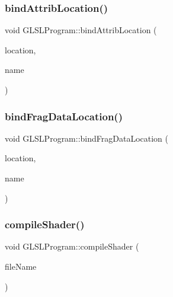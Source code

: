 \subsubsection{\texorpdfstring{bindAttribLocation()}{bindAttribLocation()}}
{\footnotesize\ttfamily void G\+L\+S\+L\+Program\+::bind\+Attrib\+Location (\begin{DoxyParamCaption}\item[{G\+Luint}]{location,  }\item[{const char $\ast$}]{name }\end{DoxyParamCaption})}

\mbox{\label{class_g_l_s_l_program_a44270f942de121ef2493e26f1226a902}} 
\subsubsection{\texorpdfstring{bindFragDataLocation()}{bindFragDataLocation()}}
{\footnotesize\ttfamily void G\+L\+S\+L\+Program\+::bind\+Frag\+Data\+Location (\begin{DoxyParamCaption}\item[{G\+Luint}]{location,  }\item[{const char $\ast$}]{name }\end{DoxyParamCaption})}

\mbox{\label{class_g_l_s_l_program_a7ac90d2adc456b0bd71fae53ab76812c}} 
\subsubsection{\texorpdfstring{compileShader()}{compileShader()}\hspace{0.1cm}{\footnotesize\ttfamily [1/3]}}
{\footnotesize\ttfamily void G\+L\+S\+L\+Program\+::compile\+Shader (\begin{DoxyParamCaption}\item[{const char $\ast$}]{file\+Name }\end{DoxyParamCaption})}

\mbox{\label{class_g_l_s_l_program_af69e0c7d69ad386b150e5bb9ae66bf26}} 
